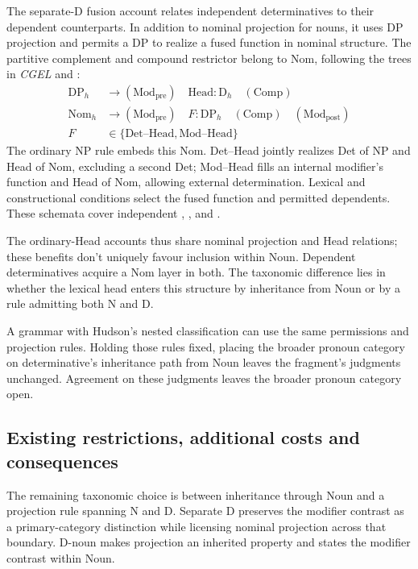 \documentclass[12pt]{article}
\begin{document}
The separate-D fusion account relates independent determinatives to their dependent counterparts. In addition to nominal projection for nouns, it uses DP projection and permits a DP to realize a fused function in nominal structure. The partitive complement and compound restrictor belong to Nom, following the trees in \textit{CGEL} and \textcite[582]{Payne2007}:
\[
\begin{aligned}
\mathrm{DP}_{h} &\to (\mathrm{Mod}_{\mathrm{pre}})\quad \mathrm{Head}:\mathrm{D}_{h}\quad (\mathrm{Comp}) \\
\mathrm{Nom}_{h} &\to (\mathrm{Mod}_{\mathrm{pre}})\quad F:\mathrm{DP}_{h}\quad (\mathrm{Comp})\quad (\mathrm{Mod}_{\mathrm{post}}) \\
F&\in\{\mathrm{Det\text{--}Head},\mathrm{Mod\text{--}Head}\}
\end{aligned}
\]
The ordinary NP rule embeds this Nom. Det--Head jointly realizes Det of NP and Head of Nom, excluding a second Det; Mod--Head fills an internal modifier's function and Head of Nom, allowing external determination. Lexical and constructional conditions select the fused function and permitted dependents. These schemata cover independent , ,  and .

The ordinary-Head accounts thus share nominal projection and Head relations; these benefits don't uniquely favour inclusion within Noun. Dependent determinatives acquire a Nom layer in both. The taxonomic difference lies in whether the lexical head enters this structure by inheritance from Noun or by a rule admitting both N and D.

A grammar with Hudson's nested classification can use the same permissions and projection rules. Holding those rules fixed, placing the broader pronoun category on determinative's inheritance path from Noun leaves the fragment's judgments unchanged. Agreement on these judgments leaves the broader pronoun category open.

\subsection{Existing restrictions, additional costs and consequences}\label{sec:costs}

The remaining taxonomic choice is between inheritance through Noun and a projection rule spanning N and D. Separate D preserves the modifier contrast as a primary-category distinction while licensing nominal projection across that boundary. D-noun makes projection an inherited property and states the modifier contrast within Noun.
\end{document}
